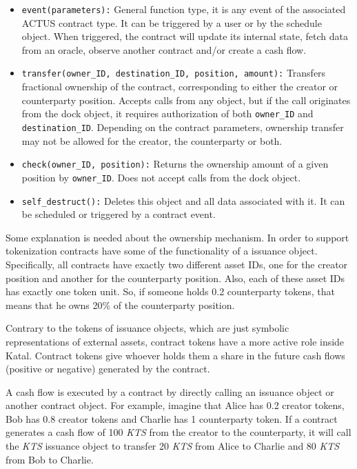 \documentclass[conference]{IEEEtran}
\begin{document}
\begin{itemize}
	\item \texttt{event(parameters):} General function type, it is any event of the associated ACTUS contract type. It can be triggered by a user or by the schedule object. When triggered, the contract will update its internal state, fetch data from an oracle, observe another contract and/or create a cash flow.
	\item \texttt{transfer(owner\_ID, destination\_ID, position, amount):} Transfers fractional ownership of the contract, corresponding to either the creator or counterparty position. Accepts calls from any object, but if the call originates from the dock object, it requires authorization of both \texttt{owner\_ID} and \texttt{destination\_ID}. Depending on the contract parameters, ownership transfer may not be allowed for the creator, the counterparty or both.
	\item \texttt{check(owner\_ID, position):} Returns the ownership amount of a given position by \texttt{owner\_ID}. Does not accept calls from the dock object.
	\item \texttt{self\_destruct():} Deletes this object and all data associated with it. It can be scheduled or triggered by a contract event.
\end{itemize}

Some explanation is needed about the ownership mechanism. In order to support tokenization contracts have some of the functionality of a issuance object. Specifically, all contracts have exactly two different asset IDs, one for the creator position and another for the counterparty position. Also, each of these asset IDs has exactly one token unit. So, if someone holds 0.2 counterparty tokens, that means that he owns 20\% of the counterparty position.

Contrary to the tokens of issuance objects, which are just symbolic representations of external assets, contract tokens have a more active role inside Katal. Contract tokens give whoever holds them a share in the future cash flows (positive or negative) generated by the contract.

A cash flow is executed by a contract by directly calling an issuance object or another contract object. For example, imagine that Alice has 0.2 creator tokens, Bob has 0.8 creator tokens and Charlie has 1 counterparty token. If a contract generates a cash flow of 100 \textit{KTS} from the creator to the counterparty, it will call the \textit{KTS} issuance object to transfer 20 \textit{KTS} from Alice to Charlie and 80 \textit{KTS} from Bob to Charlie.
\end{document}
